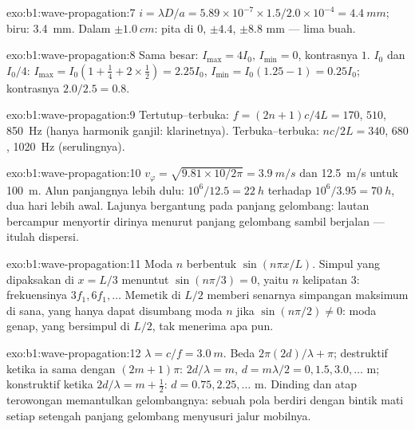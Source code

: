 \begin{solution}{exo:b1:wave-propagation:7}
$i = \lambda D/a = 5.89\times10^{-7} \times 1.5/2.0\times10^{-4} =
\qty{4.4}{mm}$; biru: \qty{3.4}{mm}. Dalam $\pm\qty{1.0}{cm}$: pita di
$0$, $\pm 4.4$, $\pm 8.8$ mm --- lima buah.
\end{solution}

\begin{solution}{exo:b1:wave-propagation:8}
Sama besar: $I_{\max} = 4I_0$, $I_{\min} = 0$, kontrasnya $1$. $I_0$ dan $I_0/4$:
$I_{\max} = I_0(1 + \tfrac14 + 2 \times \tfrac12) = 2.25I_0$, $I_{\min} =
I_0(1.25 - 1) = 0.25I_0$; kontrasnya $2.0/2.5 = 0.8$.
\end{solution}

\begin{solution}{exo:b1:wave-propagation:9}
Tertutup--terbuka: $f = (2n + 1)c/4L = 170$, $510$, \qty{850}{Hz} (hanya
harmonik ganjil: klarinetnya). Terbuka--terbuka: $nc/2L = 340$, $680$,
\qty{1020}{Hz} (serulingnya).
\end{solution}

\begin{solution}{exo:b1:wave-propagation:10}
$v_\varphi = \sqrt{9.81 \times 10/2\pi} = \qty{3.9}{m/s}$ dan
\qty{12.5}{m/s} untuk \qty{100}{m}. Alun panjangnya lebih dulu: $10^6/12.5 =
\qty{22}{h}$ terhadap $10^6/3.95 = \qty{70}{h}$, dua hari lebih awal.
Lajunya bergantung pada panjang gelombang: lautan bercampur menyortir
dirinya menurut panjang gelombang sambil berjalan --- itulah dispersi.
\end{solution}

\begin{solution}{exo:b1:wave-propagation:11}
Moda $n$ berbentuk $\sin(n\pi x/L)$. Simpul yang dipaksakan di $x = L/3$
menuntut $\sin(n\pi/3) = 0$, yaitu $n$ kelipatan $3$: frekuensinya $3f_1,
6f_1, \dots$ Memetik di $L/2$ memberi senarnya simpangan maksimum di
sana, yang hanya dapat disumbang moda $n$ jika $\sin(n\pi/2) \neq 0$:
moda genap, yang bersimpul di $L/2$, tak menerima apa pun.
\end{solution}

\begin{solution}{exo:b1:wave-propagation:12}
$\lambda = c/f = \qty{3.0}{m}$. Beda  $2\pi(2d)/\lambda + \pi$;
destruktif ketika ia sama dengan $(2m + 1)\pi$: $2d/\lambda = m$,
$d = m\lambda/2 = 0, 1.5, 3.0, \dots$ m; konstruktif ketika $2d/\lambda =
m + \tfrac12$: $d = 0.75, 2.25, \dots$ m. Dinding dan atap terowongan
memantulkan gelombangnya: sebuah pola berdiri dengan bintik mati setiap
setengah panjang gelombang menyusuri jalur mobilnya.
\end{solution}

